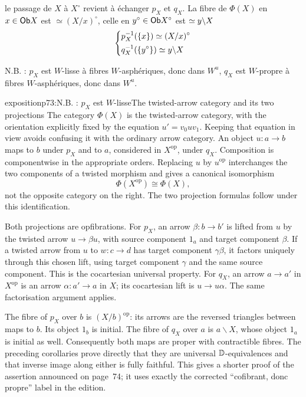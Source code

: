 le passage de $X$ à $X^\circ$ revient à échanger $p_X$ et $q_X$. La fibre de $\Phi(X)$ en $x \in \mathsf{Ob} X$ est $\simeq (X/x)^\circ$, celle en $y^\circ \in \mathsf{Ob} X^\circ$ est $\simeq y\backslash X$
\[
\left\{
\begin{aligned}
&p_X^{-1}(\{x\}) \simeq (X/x)^\circ\\
&q_X^{-1}(\{y^\circ\}) \simeq y\backslash X
\end{aligned}
\right.
\]

N.B. : $p_X$ est $W$-lisse à fibres $W$-asphériques, donc dans $W^u$, $q_X$ est $W$-propre à fibres $W$-asphériques, donc dans $W^u$.

\begin{dcomment}{exposition}{p73:N.B. : $p_X$ est $W$-lisse}{The twisted-arrow category and its two projections}
The category $\Phi(X)$ is the twisted-arrow category, with the orientation explicitly fixed by the equation $u'=v_0uv_1$. Keeping that equation in view avoids confusing it with the ordinary arrow category. An object $u:a\to b$ maps to $b$ under $p_X$ and to $a$, considered in $X^{\mathrm{op}}$, under $q_X$. Composition is componentwise in the appropriate orders. Replacing $u$ by $u^{\mathrm{op}}$ interchanges the two components of a twisted morphism and gives a canonical isomorphism
\[
 \Phi(X^{\mathrm{op}})\cong\Phi(X),
\]
not the opposite category on the right. The two projection formulas follow under this identification.

Both projections are opfibrations. For $p_X$, an arrow $\beta:b\to b'$ is lifted from $u$ by the twisted arrow $u\to\beta u$, with source component $1_a$ and target component $\beta$. If a twisted arrow from $u$ to $w:c\to d$ has target component $\gamma\beta$, it factors uniquely through this chosen lift, using target component $\gamma$ and the same source component. This is the cocartesian universal property. For $q_X$, an arrow $a\to a'$ in $X^{\mathrm{op}}$ is an arrow $\alpha:a'\to a$ in $X$; its cocartesian lift is $u\to u\alpha$. The same factorisation argument applies.

The fibre of $p_X$ over $b$ is $(X/b)^{\mathrm{op}}$: its arrows are the reversed triangles between maps to $b$. Its object $1_b$ is initial. The fibre of $q_X$ over $a$ is $a\backslash X$, whose object $1_a$ is initial as well. Consequently both maps are proper with contractible fibres. The preceding corollaries prove directly that they are universal $\mathbb{D}$-equivalences and that inverse image along either is fully faithful. This gives a shorter proof of the assertion announced on page~74; it uses exactly the corrected ``cofibrant, donc propre'' label in the edition.


\end{dcomment}
